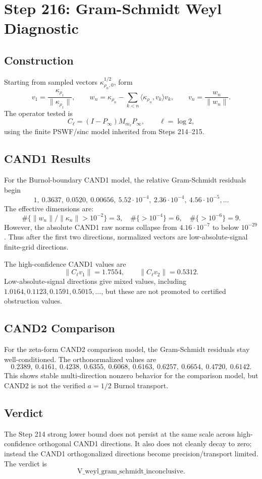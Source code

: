 \documentclass[11pt]{article}
\begin{document}
\section*{Step 216: Gram-Schmidt Weyl Diagnostic}

\subsection*{Construction}

Starting from sampled vectors \(\kappa_{\rho_n,0}^{1/2}\), form
\[
v_1=\frac{\kappa_{\rho_1}}{\|\kappa_{\rho_1}\|},\qquad
w_n=\kappa_{\rho_n}-\sum_{k<n}\langle \kappa_{\rho_n},v_k\rangle v_k,\qquad
v_n=\frac{w_n}{\|w_n\|}.
\]
The operator tested is
\[
C_\ell=(I-P_\infty)M_{m_\ell}P_\infty,\qquad \ell=\log 2,
\]
using the finite PSWF/sinc model inherited from Steps 214--215.

\subsection*{CAND1 Results}

For the Burnol-boundary CAND1 model, the relative Gram-Schmidt residuals begin
\[
1,\ 0.3637,\ 0.0520,\ 0.00656,\ 5.52\cdot 10^{-4},\
2.36\cdot 10^{-4},\ 4.56\cdot 10^{-5},\ldots
\]
The effective dimensions are:
\[
\#\{\|w_n\|/\|\kappa_n\|>10^{-2}\}=3,\quad
\#\{>10^{-4}\}=6,\quad
\#\{>10^{-6}\}=9.
\]
However, the absolute CAND1 raw norms collapse from \(4.16\cdot 10^{-7}\) to below \(10^{-29}\).  Thus after the first two directions, normalized vectors are low-absolute-signal finite-grid directions.

The high-confidence CAND1 values are
\[
\|C_\ell v_1\|=1.7554,\qquad \|C_\ell v_2\|=0.5312.
\]
Low-absolute-signal directions give mixed values, including \(1.0164,0.1123,0.1591,0.5015,\ldots\), but these are not promoted to certified obstruction values.

\subsection*{CAND2 Comparison}

For the zeta-form CAND2 comparison model, the Gram-Schmidt residuals stay well-conditioned.  The orthonormalized values are
\[
0.2389,\ 0.4161,\ 0.4238,\ 0.6355,\ 0.6068,\ 0.6163,\ 0.6257,\ 0.6654,\ 0.4720,\ 0.6142.
\]
This shows stable multi-direction nonzero behavior for the comparison model, but CAND2 is not the verified \(a=1/2\) Burnol transport.

\subsection*{Verdict}

The Step 214 strong lower bound does not persist at the same scale across high-confidence orthogonal CAND1 directions.  It also does not cleanly decay to zero; instead the CAND1 orthogonalized directions become precision/transport limited.  The verdict is
\[
\boxed{\mathrm{V\_weyl\_gram\_schmidt\_inconclusive}}.
\]
\end{document}
